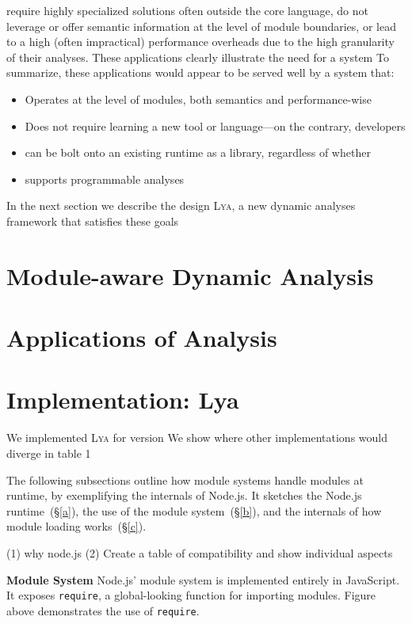 \documentclass[letterpaper,twocolumn,10pt]{article}
\newcommand{\heading}[1]{\vspace{2pt}\noindent\textbf{#1}\enspace}
\newcommand{\ttt}[1]{\texttt{#1}}
\newcommand{\sx}[1]{(\S\ref{#1})}
\newcommand{\sys}{{\scshape Lya}\xspace}
\newcommand{\fixme}[1]{{\color{red}#1}}
\begin{document}
require highly specialized solutions often outside the core language,
do not leverage or offer semantic information at the level of module boundaries,
or lead to a high (often impractical) performance overheads due to the high granularity of their analyses.
These applications clearly illustrate the need for a system 
To summarize, these applications would appear to be served well by a system that:
\begin{itemize}
  \item Operates at the level of modules, both semantics and performance-wise
  \item Does not require learning a new tool or language---on the contrary,
    developers
  \item can be bolt onto an existing runtime as a library, regardless of whether 
  \item supports programmable analyses
\end{itemize}

In the next section we describe the design \sys, a new dynamic analyses
framework that satisfies these goals

\section{Module-aware Dynamic Analysis}
\label{design}


\section{Applications of Analysis}
\label{apps}


\section{Implementation: Lya}
\label{impl}

We implemented \sys for version 
We show where other implementations would diverge in table 1

The following subsections outline how module systems handle modules at runtime, by exemplifying the internals of Node.js.
It sketches the Node.js runtime~\sx{a}, the use of the module system~\sx{b}, and the internals of how module loading works~\sx{c}.

(1) why node.js
(2) Create a table of compatibility and show individual aspects

\heading{Module System}
Node.js' module system is implemented entirely in JavaScript.
It exposes \ttt{require}, a global-looking function for importing modules.
\fixme{Figure} above demonstrates the use of \ttt{require}.
\end{document}
